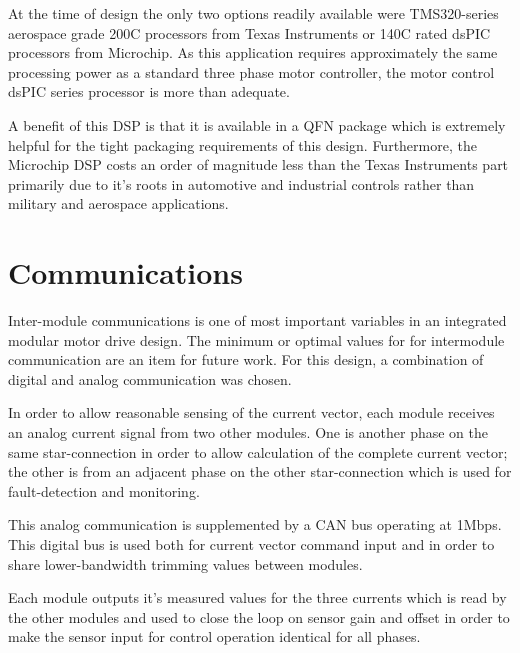 At the time of design the only two options readily available were
TMS320-series aerospace grade 200C processors from Texas Instruments or 140C
rated dsPIC processors from Microchip. As this application requires
approximately the same processing power as a standard three phase motor
controller, the motor control dsPIC series processor is more than adequate.

A benefit of this DSP is that it is available in a QFN package which is
extremely helpful for the tight packaging requirements of this design.
Furthermore, the Microchip DSP costs an order of magnitude less than the Texas
Instruments part primarily due to it's roots in automotive and industrial
controls rather than military and aerospace applications.

\section{Communications}
Inter-module communications is one of most important variables in an
integrated modular motor drive design. The minimum or optimal values for
for intermodule communication are an item for future work. For this design, a
combination of digital and analog communication was chosen.

In order to allow reasonable sensing of the current vector, each module
receives an analog current signal from two other modules.  One is another
phase on the same star-connection in order to allow calculation of the
complete current vector; the other is from an adjacent phase on the other
star-connection which is used for fault-detection and monitoring.

This analog communication is supplemented by a CAN bus operating at 1Mbps.
This digital bus is used both for current vector command input and in order to
share lower-bandwidth trimming values between modules.

Each module outputs it's measured values for the three currents which is read
by the other modules and used to close the loop on sensor gain and offset in
order to make the sensor input for control operation identical for all phases.

